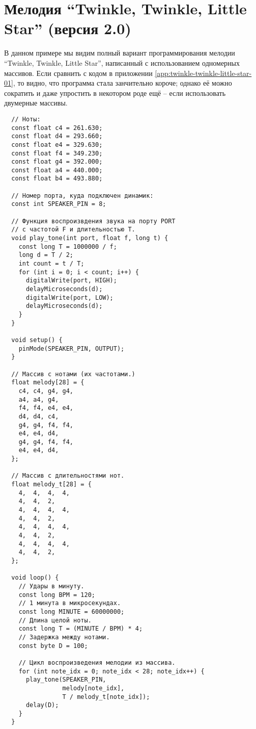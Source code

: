 \documentclass[../sparc.tex]{subfiles}
\begin{document}
\newpage
\chapter{Мелодия ``Twinkle, Twinkle, Little Star'' (версия 2.0)}
\label{app:twinkle-twinkle-little-star-02}

В данном примере мы видим полный вариант программирования мелодии ``Twinkle,
Twinkle, Little Star'', написанный с использованием одномерных массивов.  Если
сравнить с кодом в приложении \ref{app:twinkle-twinkle-little-star-01}, то
видно, что программа стала занчительно короче; однако её можно сократить и даже
упростить в некотором роде ещё -- если использовать двумерные массивы.

\begin{verbatim}
  // Ноты:
  const float c4 = 261.630;
  const float d4 = 293.660;
  const float e4 = 329.630;
  const float f4 = 349.230;
  const float g4 = 392.000;
  const float a4 = 440.000;
  const float b4 = 493.880;

  // Номер порта, куда подключен динамик:
  const int SPEAKER_PIN = 8;

  // Функция воспроизвдения звука на порту PORT
  // с частотой F и длительностью T.
  void play_tone(int port, float f, long t) {
    const long T = 1000000 / f;
    long d = T / 2;
    int count = t / T;
    for (int i = 0; i < count; i++) {
      digitalWrite(port, HIGH);
      delayMicroseconds(d);
      digitalWrite(port, LOW);
      delayMicroseconds(d);
    }
  }

  void setup() {
    pinMode(SPEAKER_PIN, OUTPUT);
  }

  // Массив с нотами (их частотами.)
  float melody[28] = {
    c4, c4, g4, g4,
    a4, a4, g4,
    f4, f4, e4, e4,
    d4, d4, c4,
    g4, g4, f4, f4,
    e4, e4, d4,
    g4, g4, f4, f4,
    e4, e4, d4,
  };

  // Массив с длительностями нот.
  float melody_t[28] = {
    4,  4,  4,  4,
    4,  4,  2,
    4,  4,  4,  4,
    4,  4,  2,
    4,  4,  4,  4,
    4,  4,  2,
    4,  4,  4,  4,
    4,  4,  2,
  };

  void loop() {
    // Удары в минуту.
    const long BPM = 120;
    // 1 минута в микросекундах.
    const long MINUTE = 60000000;
    // Длина целой ноты.
    const long T = (MINUTE / BPM) * 4;
    // Задержка между нотами.
    const byte D = 100;

    // Цикл воспроизведения мелодии из массива.
    for (int note_idx = 0; note_idx < 28; note_idx++) {
      play_tone(SPEAKER_PIN,
                melody[note_idx],
                T / melody_t[note_idx]);
      delay(D);
    }
  }
\end{verbatim}
\end{document}
